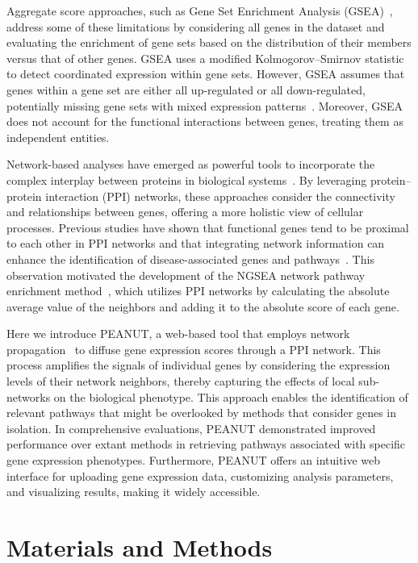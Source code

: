 \documentclass{article}
\begin{document}
Aggregate score approaches, such as Gene Set Enrichment Analysis (GSEA)~\cite{Subramanian2005}, address some of these limitations by considering all genes in the dataset and evaluating the enrichment of gene sets based on the distribution of their members versus that of other genes. GSEA uses a modified Kolmogorov--Smirnov statistic to detect coordinated expression within gene sets. However, GSEA assumes that genes within a gene set are either all up-regulated or all down-regulated, potentially missing gene sets with mixed expression patterns~\cite{Saxena2006}. Moreover, GSEA does not account for the functional interactions between genes, treating them as independent entities.

Network-based analyses have emerged as powerful tools to incorporate the complex interplay between proteins in biological systems~\cite{Cowen2017}. By leveraging protein--protein interaction (PPI) networks, these approaches consider the connectivity and relationships between genes, offering a more holistic view of cellular processes. Previous studies have shown that functional genes tend to be proximal to each other in PPI networks and that integrating network information can enhance the identification of disease-associated genes and pathways~\cite{Nitsch2009, Jiang2015}. This observation motivated the development of
the NGSEA network pathway enrichment method~\cite{Han2019}, which utilizes PPI networks by calculating the absolute average value of the neighbors and adding it to the absolute score of each gene. 

Here we introduce PEANUT, a web-based tool that employs network propagation~\cite{Cowen2017} to diffuse gene expression scores through a PPI network. This process amplifies the signals of individual genes by considering the expression levels of their network neighbors, thereby capturing the effects of local sub-networks on the biological phenotype. This approach enables the identification of relevant pathways that might be overlooked by methods that consider genes in isolation. In comprehensive evaluations, PEANUT demonstrated improved performance over extant methods in retrieving pathways associated with specific gene expression phenotypes. Furthermore, PEANUT offers an intuitive web interface for uploading gene expression data, customizing analysis parameters, and visualizing results, making it widely accessible.

\section{Materials and Methods}
\end{document}
